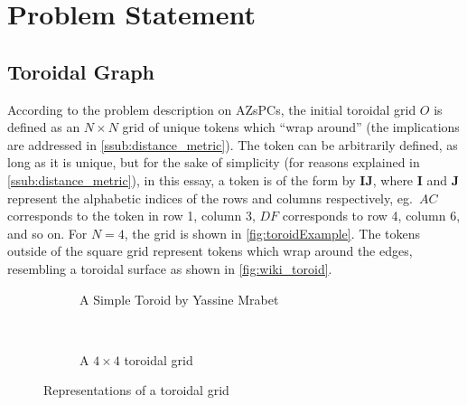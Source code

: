 \section{Problem Statement}%
\label{sec:problem_statement}

\subsection{Toroidal Graph}%
\label{sub:toroidal_graph}


According to the problem description on AZsPCs,\cite{zimmermann} the initial toroidal grid $O$ is defined as an $N\times N$ grid of unique tokens which ``wrap around'' (the implications are addressed in \ref{ssub:distance_metric}). The token can be arbitrarily defined, as long as it is unique, but for the sake of simplicity (for reasons explained in \autoref{ssub:distance_metric}), in this essay, a token is of the form by $\bm{IJ}$, where $\bm{I}$ and $\bm{J}$ represent the alphabetic indices of the rows and columns respectively, eg.~$AC$ corresponds to the token in row 1, column 3, $DF$ corresponds to row 4, column 6, and so on. For $N=4$, the grid is shown in \autoref{fig:toroidExample}. The tokens outside of the square grid represent tokens which wrap around the edges, resembling a toroidal surface as shown in \autoref{fig:wiki_toroid}.
\begin{figure}[htpb]
    \begin{subfigure}[t]{0.5\textwidth}
    \begin{center}
    \caption{A Simple Toroid by Yassine Mrabet\cite{wiki_toroid}}
    \label{fig:wiki_toroid}
    \end{center}
    \end{subfigure}
    ~
    \begin{subfigure}[t]{0.5\textwidth}
    \begin{center}
    \caption{A $4\times 4$ toroidal grid}%
    \label{fig:toroidExample}
    \end{center}
    \end{subfigure}
    \caption{Representations of a toroidal grid}
\end{figure}


